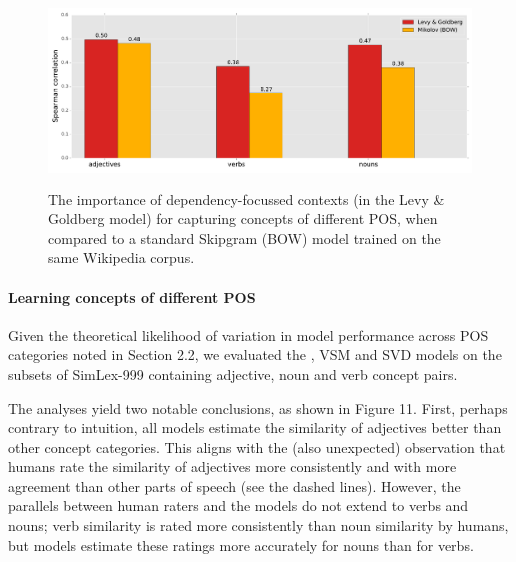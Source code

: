 \documentclass[fullname]{clv2}
\begin{document}
\begin{figure}[]  \includegraphics[width = \textwidth,height=5cm]{New_Figure_2_CL}  \caption{The importance of dependency-focussed contexts (in the Levy \& Goldberg model) for capturing concepts of different POS, when compared to a standard Skipgram (BOW) model trained on the same Wikipedia corpus.}\end{figure}



\paragraph{\bf Learning concepts of different POS}

Given the theoretical likelihood of variation in model performance across POS categories noted in Section 2.2, we evaluated the , VSM and SVD models on the subsets of SimLex-999 containing adjective, noun and verb concept pairs. 

The analyses yield two notable conclusions, as shown in Figure 11. First, perhaps contrary to intuition, all models estimate the similarity of adjectives better than other concept categories. This aligns with the (also unexpected) observation that humans rate the similarity of adjectives more consistently and with more agreement than other parts of speech (see the dashed lines). However, the parallels between human raters and the models do not extend to verbs and nouns; verb similarity is rated more consistently than noun similarity by humans, but models estimate these ratings more accurately for nouns than for verbs. 
\end{document}
